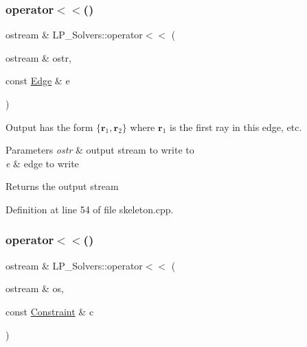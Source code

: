 \subsubsection{\texorpdfstring{operator$<$$<$()}{operator<<()}\hspace{0.1cm}{\footnotesize\ttfamily [1/4]}}
{\footnotesize\ttfamily ostream \& L\+P\+\_\+\+Solvers\+::operator$<$$<$ (\begin{DoxyParamCaption}\item[{ostream \&}]{ostr,  }\item[{const \hyperlink{group___c_l_s_solvers_class_l_p___solvers_1_1_edge}{Edge} \&}]{e }\end{DoxyParamCaption})}



Output has the form $ \{ \mathbf{r}_1, \mathbf{r}_2 \} $ where $ \mathbf{r}_1 $ is the first ray in this edge, etc. 


\begin{DoxyParams}{Parameters}
{\em ostr} & output stream to write to \\
\hline
{\em e} & edge to write \\
\hline
\end{DoxyParams}
\begin{DoxyReturn}{Returns}
the output stream 
\end{DoxyReturn}


Definition at line 54 of file skeleton.\+cpp.

\mbox{\label{namespace_l_p___solvers_aa62089e763b2d098ba78d6f25b296d1a}} 
\subsubsection{\texorpdfstring{operator$<$$<$()}{operator<<()}\hspace{0.1cm}{\footnotesize\ttfamily [2/4]}}
{\footnotesize\ttfamily ostream \& L\+P\+\_\+\+Solvers\+::operator$<$$<$ (\begin{DoxyParamCaption}\item[{ostream \&}]{os,  }\item[{const \hyperlink{group___c_l_s_solvers_class_l_p___solvers_1_1_constraint}{Constraint} \&}]{c }\end{DoxyParamCaption})}



